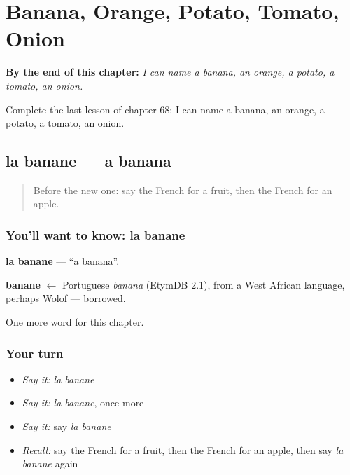 
\chapter{Banana, Orange, Potato, Tomato, Onion}
\label{ch:fr-banana-orange-potato-tomato-onion}

\begin{chapteropening}
\textbf{By the end of this chapter:} \emph{I can name a banana, an orange, a potato, a tomato, an onion.}

Complete the last lesson of chapter 68: I can name a banana, an orange, a potato, a tomato, an onion.
\end{chapteropening}

\section[la banane]{la banane — a banana}

\label{lesson:FR-C68-banane}



\begin{quote}
Before the new one: say the French for a fruit, then the French for an apple.
\end{quote}

\subsection*{You'll want to know: la banane}
\textbf{la banane} — \textquotedblleft{}a banana\textquotedblright{}.

\begin{cousinweb}
\textbf{banane} $\leftarrow$ Portuguese \emph{banana} (EtymDB 2.1), from a West African language, perhaps Wolof — borrowed.
\end{cousinweb}

\begin{grammarlens}[title={What you've built}]
One more word for this chapter.
\end{grammarlens}

\subsection*{Your turn}
\begin{itemize}
\raggedright
  \item \emph{Say it:} \emph{la banane}
  \item \emph{Say it:} \emph{la banane}, once more
  \item \emph{Say it:} say \emph{la banane}
  \item \emph{Recall:} say the French for a fruit, then the French for an apple, then say \emph{la banane} again
\end{itemize}


